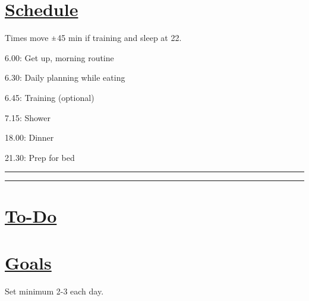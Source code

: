 \documentclass[11pt]{article}
\newcommand{\rpm}{\raisebox{.2ex}{$\scriptstyle\pm$}}
\begin{document}
\begin{multicols}{2}

\section*{\underline{Schedule}} 
Times move $\rpm$45 min if training and sleep at 22. 
  \begin{todolist}[itemsep=8pt]
    \item 6.00: Get up, morning routine
	\item 6.30: Daily planning while eating   
    \item 6.45: Training (optional)
    \item 7.15: Shower
    \item
    \item 
    \item 
    \item     
    \item 18.00: Dinner
    \item 21.30: Prep for bed
  \end{todolist}

\begin{flushleft}
\rule{122pt}{1pt}\vline\rule{122pt}{1pt}
\end{flushleft}


\section*{\underline{To-Do}}
  \begin{todolist}[itemsep=8pt]
    \item 
    \item 
    \item 
    \item 
    \item 
  \end{todolist}

\columnbreak

\section*{\underline{Goals}}
Set minimum 2-3 each day.
  \begin{todolist}[itemsep=8pt]
    \item 
    \item 
    \item 
    \item 
    \item 
  \end{todolist}


\end{multicols}
\end{document}
